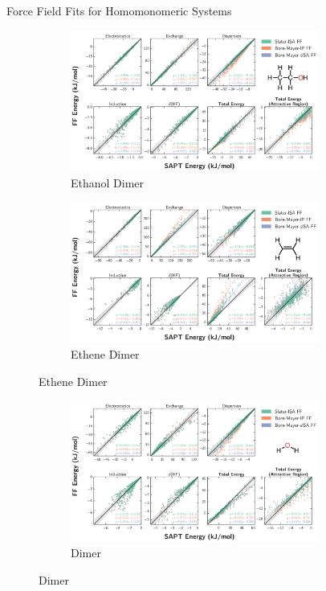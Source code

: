 \begin{section}{Force Field Fits for Homomonomeric Systems}
\begin{figure}
\begin{subfigure}{\textwidth}
    \end{subfigure}
    \end{figure}
    \begin{figure}
    \ContinuedFloat
    \begin{subfigure}{\textwidth}
        \caption{Ethanol Dimer}
        \includegraphics[width=0.9\textwidth]{isotropic/si/ethanol_ethanol_scatter.pdf}
    \end{subfigure}
    \begin{subfigure}{\textwidth}
        \caption{Ethene Dimer}
        \includegraphics[width=0.9\textwidth]{isotropic/si/ethene_ethene_scatter.pdf}
    \end{subfigure}
    \end{figure}
    \begin{figure}
    \ContinuedFloat
    \begin{subfigure}{\textwidth}
        \caption{\ho Dimer}
        \includegraphics[width=0.9\textwidth]{isotropic/si/h2o_h2o_scatter.pdf}

\end{subfigure}
\end{figure}
\end{section}
